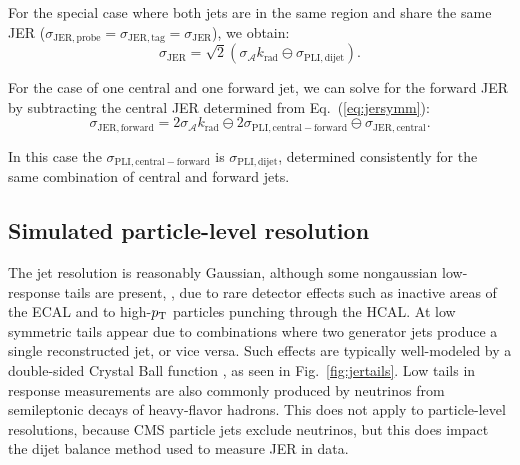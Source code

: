 \documentclass[11pt,twoside,a4paper,cmspaper,final,collab]{cms-tdr}
\begin{document}
For the special case where both jets are in the same region and share the same JER ($\sigma_\mathrm{JER,probe}=\sigma_\mathrm{JER,tag}=\sigma_\mathrm{JER}$), we obtain:
\begin{equation}\label{eq:jersymm}
\sigma_\mathrm{JER} = \sqrt{2} (\sigma_{\mathcal{A}} k_\text{rad}\ominus \sigma_\mathrm{PLI,dijet}) .
\end{equation}

For the case of one central and one forward jet, we can solve for the forward JER by subtracting the central JER determined from Eq.~(\ref{eq:jersymm}):
\begin{equation}
\sigma_\mathrm{JER,forward} = 2\sigma_{\mathcal{A}} k_\text{rad}\ominus 2\sigma_\mathrm{PLI,central-forward} \ominus \sigma_\mathrm{JER,central}.
\label{eq:jer_fwd_ctr}
\end{equation}

In this case the $\sigma_\mathrm{PLI,central-forward}$ is $\sigma_\mathrm{PLI,dijet}$, determined consistently for the same combination of central and forward jets.

\subsection{Simulated particle-level resolution}

The jet \pt resolution is reasonably Gaussian, although some nongaussian low-response tails are present, \eg, due to rare detector effects such as inactive areas of the ECAL and to high-$p_{\mathrm{T}}$ particles punching through the HCAL. At low \pt symmetric tails appear due to combinations where two generator jets produce a single reconstructed jet, or vice versa. Such effects are typically well-modeled by a double-sided Crystal Ball function \cite{crystalball}, as seen in Fig.~\ref{fig:jertails}.
Low tails in response measurements are also commonly produced by neutrinos from semileptonic decays of heavy-flavor hadrons. This does not apply to particle-level resolutions, because CMS particle jets exclude neutrinos, but this does impact the dijet balance method used to measure JER in data.
\end{document}
